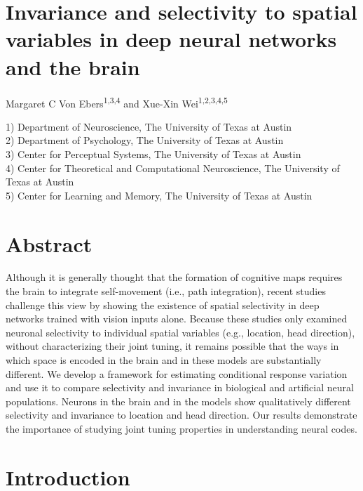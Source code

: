 \documentclass[11pt]{article}
\begin{document}
\section*{\LARGE  Invariance and selectivity to spatial variables in deep neural networks and the brain }

Margaret C Von Ebers\textsuperscript{1,3,4} and Xue-Xin Wei\textsuperscript{1,2,3,4,5}

1) Department of Neuroscience, The University of Texas at Austin\\
2) Department of Psychology, The University of Texas at Austin\\
3) Center for Perceptual Systems, The University of Texas at Austin\\
4) Center for Theoretical and Computational Neuroscience, The University of Texas at Austin\\
5) Center for Learning and Memory, The University of Texas at Austin

\section*{Abstract}
Although it is generally thought that the formation of cognitive maps requires the brain to integrate self-movement (i.e., path integration), recent studies challenge this view by showing the existence of spatial selectivity in deep networks trained with vision inputs alone.
Because these studies only examined neuronal selectivity to individual spatial variables (e.g., location, head direction), without characterizing their joint tuning,
it remains possible that the ways in which space is encoded in the brain and in these models are substantially different.
We develop a framework for estimating conditional response variation and use it to compare selectivity and invariance in biological and artificial neural populations. Neurons in the brain and in the models show qualitatively different selectivity and invariance to location and head direction. Our results demonstrate the importance of studying joint tuning properties in understanding neural codes.

\newpage
\section{Introduction}
\end{document}
